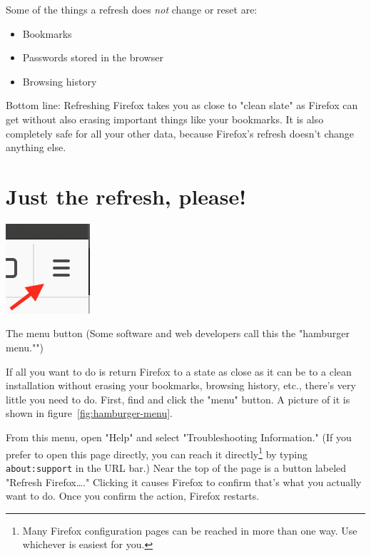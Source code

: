 \documentclass{tufte-handout}
\begin{document}
Some of the things a refresh does \emph{not} change or reset are:
\begin{itemize}
	\item{Bookmarks}
	\item{Passwords stored in the browser}
	\item{Browsing history}
\end{itemize}


Bottom line:  Refreshing Firefox takes you as close to "clean slate" as Firefox can get without also erasing important things like your bookmarks.  It is also completely safe for all your other data, because Firefox's refresh doesn't change anything else.





\section{Just the refresh, please!}\label{section:just-the-refresh-please}

\begin{marginfigure}
	\includegraphics{images/hamburger-menu.png}
	\caption{The menu button (Some software and web developers call this the "hamburger menu."")}
	\label{fig:hamburger-menu}
\end{marginfigure}

If all you want to do is return Firefox to a state as close as it can be to a clean installation without erasing your bookmarks, browsing history, etc., there's very little you need to do.  First, find and click the "menu" button.  A picture of it is shown in figure~\ref{fig:hamburger-menu}.

From this menu, open "Help" and select "Troubleshooting Information."  (If you prefer to open this page directly, you can reach it directly\footnote{Many Firefox configuration pages can be reached in more than one way.  Use whichever is easiest for you.} by typing \texttt{about:support} in the URL bar.)  Near the top of the page is a button labeled "Refresh Firefox\ldots{}."  Clicking it causes Firefox to confirm that's what you actually want to do.  Once you confirm the action, Firefox restarts.
\end{document}
